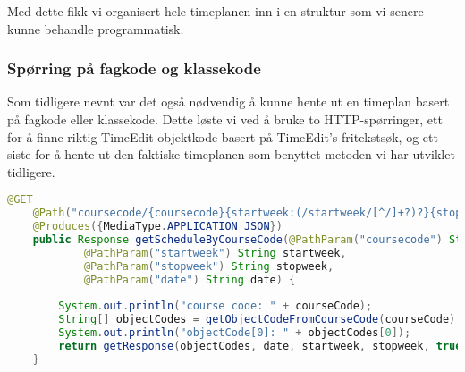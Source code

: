 \documentclass[../main.tex]{subfiles}
\begin{document}
Med dette fikk vi organisert hele timeplanen inn i en struktur som vi senere kunne behandle programmatisk.  

\newpage

\subsubsection{Spørring på fagkode og klassekode}

Som tidligere nevnt var det også nødvendig å kunne hente ut en timeplan basert på fagkode eller klassekode. Dette løste vi ved å bruke to HTTP-spørringer, ett for å finne riktig TimeEdit objektkode basert på TimeEdit’s fritekstsøk, og ett siste for å hente ut den faktiske timeplanen som benyttet metoden vi har utviklet tidligere.

\begin{lstlisting}[language=Java, frame=single, caption={Utdrag fra en JAX-RS annotert REST resource metode i klassen TimeEditService}]
    @GET    
    @Path("coursecode/{coursecode}{startweek:(/startweek/[^/]+?)?}{stopweek:(/stopweek/[^/]+?)?}{date:(/date/[^/]+?)?}")
    @Produces({MediaType.APPLICATION_JSON})
    public Response getScheduleByCourseCode(@PathParam("coursecode") String courseCode,
            @PathParam("startweek") String startweek,
            @PathParam("stopweek") String stopweek,
            @PathParam("date") String date) {
        
        System.out.println("course code: " + courseCode);
        String[] objectCodes = getObjectCodeFromCourseCode(courseCode).split("/");
        System.out.println("objectCode[0]: " + objectCodes[0]);
        return getResponse(objectCodes, date, startweek, stopweek, true);
    }
\end{lstlisting}
\end{document}

